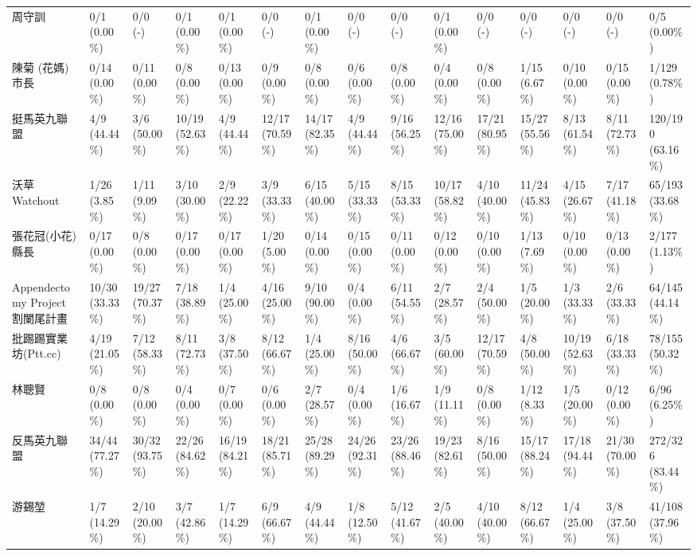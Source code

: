 \documentclass[letterpaper, 10pt, conference]{ieeeconf}   %
\begin{document}
\begin{CJK}{UTF8}{bsmi}
\begin{landscape}
\begin{longtable}[c]{@{}L{2.45cm}L{1.1cm}L{1.1cm}L{1.1cm}L{1.1cm}L{1.1cm}L{1.1cm}L{1.1cm}L{1.1cm}L{1.1cm}L{1.1cm}L{1.1cm}L{1.1cm}L{1.1cm}L{1.1cm}@{}}
周守訓 & 0/1 (0.00\%) & 0/0 (-) & 0/1 (0.00\%) & 0/1 (0.00\%) & 0/0 (-) & 0/1 (0.00\%) & 0/0 (-) & 0/0 (-) & 0/1 (0.00\%) & 0/0 (-) & 0/0 (-) & 0/0 (-) & 0/0 (-) & 0/5 (0.00\%) \\
陳菊 (花媽) 市長 & 0/14 (0.00\%) & 0/11 (0.00\%) & 0/8 (0.00\%) & 0/13 (0.00\%) & 0/9 (0.00\%) & 0/8 (0.00\%) & 0/6 (0.00\%) & 0/8 (0.00\%) & 0/4 (0.00\%) & 0/8 (0.00\%) & 1/15 (6.67\%) & 0/10 (0.00\%) & 0/15 (0.00\%) & 1/129 (0.78\%) \\
挺馬英九聯盟 & 4/9 (44.44\%) & 3/6 (50.00\%) & 10/19 (52.63\%) & 4/9 (44.44\%) & 12/17 (70.59\%) & 14/17 (82.35\%) & 4/9 (44.44\%) & 9/16 (56.25\%) & 12/16 (75.00\%) & 17/21 (80.95\%) & 15/27 (55.56\%) & 8/13 (61.54\%) & 8/11 (72.73\%) & 120/190 (63.16\%) \\
沃草 Watchout & 1/26 (3.85\%) & 1/11 (9.09\%) & 3/10 (30.00\%) & 2/9 (22.22\%) & 3/9 (33.33\%) & 6/15 (40.00\%) & 5/15 (33.33\%) & 8/15 (53.33\%) & 10/17 (58.82\%) & 4/10 (40.00\%) & 11/24 (45.83\%) & 4/15 (26.67\%) & 7/17 (41.18\%) & 65/193 (33.68\%) \\
張花冠(小花)縣長 & 0/17 (0.00\%) & 0/8 (0.00\%) & 0/17 (0.00\%) & 0/17 (0.00\%) & 1/20 (5.00\%) & 0/14 (0.00\%) & 0/15 (0.00\%) & 0/11 (0.00\%) & 0/12 (0.00\%) & 0/10 (0.00\%) & 1/13 (7.69\%) & 0/10 (0.00\%) & 0/13 (0.00\%) & 2/177 (1.13\%) \\
Appendectomy Project 割闌尾計畫 & 10/30 (33.33\%) & 19/27 (70.37\%) & 7/18 (38.89\%) & 1/4 (25.00\%) & 4/16 (25.00\%) & 9/10 (90.00\%) & 0/4 (0.00\%) & 6/11 (54.55\%) & 2/7 (28.57\%) & 2/4 (50.00\%) & 1/5 (20.00\%) & 1/3 (33.33\%) & 2/6 (33.33\%) & 64/145 (44.14\%) \\
批踢踢實業坊(Ptt.cc) & 4/19 (21.05\%) & 7/12 (58.33\%) & 8/11 (72.73\%) & 3/8 (37.50\%) & 8/12 (66.67\%) & 1/4 (25.00\%) & 8/16 (50.00\%) & 4/6 (66.67\%) & 3/5 (60.00\%) & 12/17 (70.59\%) & 4/8 (50.00\%) & 10/19 (52.63\%) & 6/18 (33.33\%) & 78/155 (50.32\%) \\
林聰賢 & 0/8 (0.00\%) & 0/8 (0.00\%) & 0/4 (0.00\%) & 0/7 (0.00\%) & 0/6 (0.00\%) & 2/7 (28.57\%) & 0/4 (0.00\%) & 1/6 (16.67\%) & 1/9 (11.11\%) & 0/8 (0.00\%) & 1/12 (8.33\%) & 1/5 (20.00\%) & 0/12 (0.00\%) & 6/96 (6.25\%) \\
反馬英九聯盟 & 34/44 (77.27\%) & 30/32 (93.75\%) & 22/26 (84.62\%) & 16/19 (84.21\%) & 18/21 (85.71\%) & 25/28 (89.29\%) & 24/26 (92.31\%) & 23/26 (88.46\%) & 19/23 (82.61\%) & 8/16 (50.00\%) & 15/17 (88.24\%) & 17/18 (94.44\%) & 21/30 (70.00\%) & 272/326 (83.44\%) \\
游錫堃 & 1/7 (14.29\%) & 2/10 (20.00\%) & 3/7 (42.86\%) & 1/7 (14.29\%) & 6/9 (66.67\%) & 4/9 (44.44\%) & 1/8 (12.50\%) & 5/12 (41.67\%) & 2/5 (40.00\%) & 4/10 (40.00\%) & 8/12 (66.67\%) & 1/4 (25.00\%) & 3/8 (37.50\%) & 41/108 (37.96\%) \\

\end{longtable}
\end{landscape}
\end{CJK}
\end{document}
